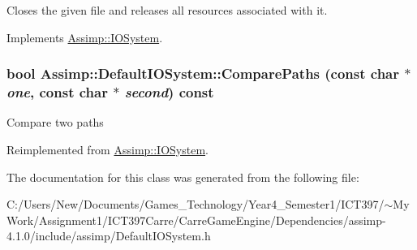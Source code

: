 Closes the given file and releases all resources associated with it. 

Implements \hyperlink{class_assimp_1_1_i_o_system_8c334d60f04bceeb6bd0157d21723f3e}{Assimp::IOSystem}.\hypertarget{class_assimp_1_1_default_i_o_system_0eb1be0b288bdad621f9036bd5290fe7}{
\subsubsection[ComparePaths]{\setlength{\rightskip}{0pt plus 5cm}bool Assimp::DefaultIOSystem::ComparePaths (const char $\ast$ {\em one}, \/  const char $\ast$ {\em second}) const}}
\label{class_assimp_1_1_default_i_o_system_0eb1be0b288bdad621f9036bd5290fe7}


Compare two paths 

Reimplemented from \hyperlink{class_assimp_1_1_i_o_system_11349a65b353ed62f655c3dd802b9062}{Assimp::IOSystem}.

The documentation for this class was generated from the following file:\begin{CompactItemize}
\item 
C:/Users/New/Documents/Games\_\-Technology/Year4\_\-Semester1/ICT397/$\sim$My Work/Assignment1/ICT397Carre/CarreGameEngine/Dependencies/assimp-4.1.0/include/assimp/DefaultIOSystem.h\end{CompactItemize}
